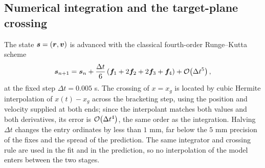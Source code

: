 \subsection{Numerical integration and the target-plane crossing}

The state $\bm{s}=(\bm{r},\bm{v})$ is advanced with the classical
fourth-order Runge--Kutta scheme
\begin{equation}
  \bm{s}_{n+1}=\bm{s}_n+\frac{\Delta t}{6}\left(\bm{f}_1+2\bm{f}_2+2\bm{f}_3+\bm{f}_4\right)
  +\mathcal{O}\!\left(\Delta t^5\right),
  \label{eq:rk4}
\end{equation}
at the fixed step $\Delta t=0.005$ s. The crossing of $x=x_g$ is located by
cubic Hermite interpolation of $x(t)-x_g$ across the bracketing step, using the
position and velocity supplied at both ends; since the interpolant matches both
values and both derivatives, its error is $\mathcal{O}\!\left(\Delta t^4\right)$, the same order
as the integration. Halving $\Delta t$ changes the entry ordinates by less than
$1$ mm, far below the $5$ mm precision of the fixes and the spread of the
prediction. The same integrator and crossing rule are used in the fit and in the
prediction, so no interpolation of the model enters between the two stages.
